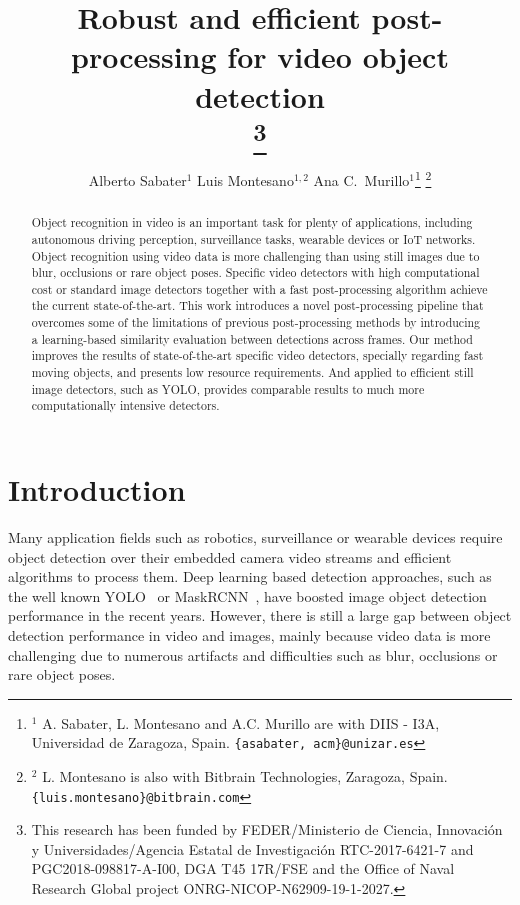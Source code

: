 \documentclass[letterpaper, 10 pt, conference]{ieeeconf}
\title{\LARGE \bf
Robust and efficient post-processing for video object detection\\
\thanks{This research has been funded by FEDER/Ministerio de Ciencia, Innovación y Universidades/Agencia Estatal de Investigación RTC-2017-6421-7 
and PGC2018-098817-A-I00, DGA T45 17R/FSE and the Office of Naval Research Global project ONRG-NICOP-N62909-19-1-2027.
}}
\author{Alberto Sabater$^{1}$ \hspace{0.5cm} Luis Montesano$^{1,2}$ \hspace{0.5cm}   Ana C.~Murillo$^{1}$\thanks{$^{1}$ A. Sabater, L. Montesano and A.C. Murillo are with 
DIIS - I3A, Universidad de Zaragoza, Spain. {\tt\small \{asabater, acm\}@unizar.es}
}
\thanks{$^{2}$  L. Montesano is also with Bitbrain Technologies, Zaragoza, Spain. {\tt\small \{luis.montesano\}@bitbrain.com}
}
}
\begin{document}
\maketitle
\thispagestyle{empty}
\pagestyle{empty}


\begin{abstract}


Object recognition in video is an important task for plenty of applications, including autonomous driving perception, surveillance tasks, wearable devices or IoT networks. Object recognition using video data is more challenging than using still images due to blur, occlusions or rare object poses. Specific video detectors with high computational cost or standard image detectors together with a fast post-processing algorithm achieve the current state-of-the-art. This work introduces a novel post-processing pipeline that overcomes some of the limitations of previous post-processing methods 
by introducing a learning-based similarity evaluation between detections across frames. 
Our method improves the results of state-of-the-art specific video detectors, specially regarding fast moving objects, and presents low resource requirements. And applied to efficient still image detectors, such as YOLO, provides comparable results to much more computationally intensive detectors. 







\end{abstract}


\section{Introduction}





















Many application fields such as robotics, surveillance or wearable devices require object detection over their embedded camera video streams and efficient algorithms to process them. 
Deep learning based detection approaches, such as the well known YOLO~\cite{redmon2016you} or MaskRCNN~\cite{he2017mask}, have boosted image object detection performance in the recent years. 
However, there is still a large gap between object detection performance in video and images, mainly because video data is more challenging due to numerous artifacts and difficulties such as blur, occlusions or rare object poses.
\end{document}
